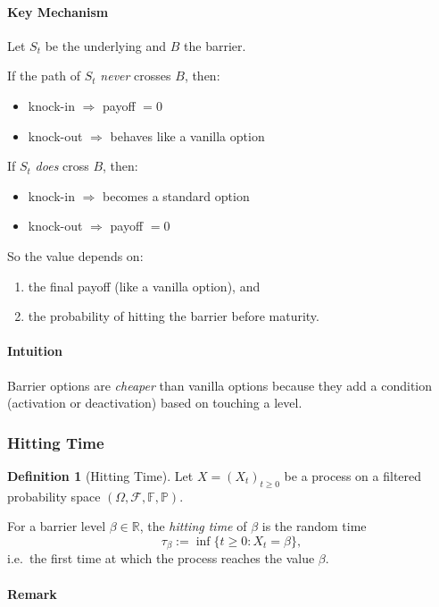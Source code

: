 \documentclass[12pt,a4paper]{article}
\theoremstyle{definition}
\newtheorem{definition}{Definition}[section]
\begin{document}
\paragraph{Key Mechanism}

Let $S_t$ be the underlying and $B$ the barrier.

If the path of $S_t$ \emph{never} crosses $B$, then:
\begin{itemize}
\item knock-in $\Rightarrow$ payoff $= 0$
\item knock-out $\Rightarrow$ behaves like a vanilla option
\end{itemize}

If $S_t$ \emph{does} cross $B$, then:
\begin{itemize}
\item knock-in $\Rightarrow$ becomes a standard option
\item knock-out $\Rightarrow$ payoff $= 0$
\end{itemize}

So the value depends on:
\begin{enumerate}
\item the final payoff (like a vanilla option), and
\item the probability of hitting the barrier before maturity.
\end{enumerate}

\paragraph{Intuition}

Barrier options are \emph{cheaper} than vanilla options because they add a condition (activation or deactivation) based on touching a level.

\subsubsection{Hitting Time}
\begin{definition}[Hitting Time]
Let $X = (X_t)_{t \geq 0}$ be a process on a filtered probability space $(\Omega, \mathcal{F}, \mathbb{F}, \mathbb{P})$.

For a barrier level $\beta \in \mathbb{R}$, the \emph{hitting time} of $\beta$ is the random time
\[
\tau_\beta := \inf\{t \geq 0 : X_t = \beta\},
\]
i.e.\ the first time at which the process reaches the value $\beta$.
\end{definition}

\paragraph{Remark}
\end{document}
